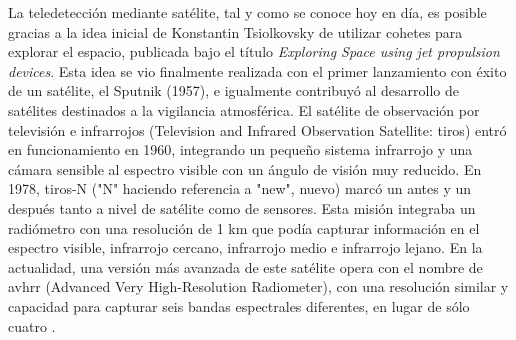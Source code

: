 La teledetección mediante satélite, tal y como se conoce hoy en día, es posible gracias a la idea inicial de Konstantin Tsiolkovsky de utilizar cohetes para explorar el espacio, publicada bajo el título \textit{Exploring Space using jet propulsion devices}. Esta idea se vio finalmente realizada con el primer lanzamiento con éxito de un satélite, el Sputnik (1957), e igualmente contribuyó al desarrollo de satélites destinados a la vigilancia atmosférica. El satélite de observación por televisión e infrarrojos (Television and Infrared Observation Satellite: \acrshort{tiros}) entró en funcionamiento en 1960, integrando un pequeño sistema infrarrojo y una cámara sensible al espectro visible con un ángulo de visión muy reducido. En 1978, \acrshort{tiros}-N ("N" haciendo referencia a "new", nuevo) marcó un antes y un después tanto a nivel de satélite como de sensores. Esta misión integraba un radiómetro con una resolución de 1 \si{\kilo\meter} que podía capturar información en el espectro visible, infrarrojo cercano, infrarrojo medio e infrarrojo lejano. En la actualidad, una versión más avanzada de este satélite opera con el nombre de \acrshort{avhrr} (Advanced Very High-Resolution Radiometer), con una resolución similar y capacidad para capturar seis bandas espectrales diferentes, en lugar de sólo cuatro \cite{national_oceanic_and_atmospheric_administration_avhrr3_nodate}.   

